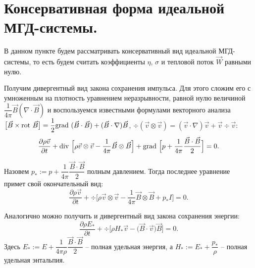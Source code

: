 \documentclass[14pt, a4paper, fleqn]{extreport}
\begin{document}
    \section{Консервативная форма идеальной \\
             МГД-системы.}

    В данном пункте будем рассматривать консервативный вид идеальной
    МГД-системы, то есть будем считать коэффициенты $\eta$, $\sigma$ 
    и тепловой поток $\vec{W}$ равными нулю.
    
    Получим дивергентный вид закона сохранения импульса. 
    Для этого сложим его с умноженным на плотность уравнением неразрывности,
    равной нулю величиной $\dfrac{1}{4\pi}\vec{B}(\nabla\cdot\vec{B})$
    и воспользуемся известными формулами векторного анализа 
    $\big[ \vec{B} \times \text{rot }{\vec{B}} \big] = 
        \dfrac{1}{2}\text{grad }{(\vec{B} \cdot \vec{B})} + (\vec{B} \cdot \nabla)\vec{B}$,
    $\div{(\vec{v}\otimes\vec{v})} = (\vec{v} \cdot \nabla)\vec{v} + \vec{v}\div{\vec{v}}$:
    \begin{equation*}
        \dfrac{\partial\rho\vec{v}}{\partial t}
            + \text{div }{\Big[ \rho\vec{v}\otimes\vec{v} - \dfrac{1}{4\pi}\vec{B}\otimes\vec{B} \Big]}
            + \text{grad }{\Big[ p + \dfrac{1}{4\pi}\dfrac{\vec{B}\cdot\vec{B}}{2} \Big]} = 0.
    \end{equation*}
    
    Назовем $p_* := p + \dfrac{1}{4\pi}\dfrac{\vec{B}\cdot\vec{B}}{2}$ полным давлением.
    Тогда последнее уравнение примет свой окончательный вид:
    \begin{equation*}
        \dfrac{\partial\rho\vec{v}}{\partial t}
            + \div{\Big[ \rho\vec{v}\otimes\vec{v} - \dfrac{1}{4\pi}\vec{B}\otimes\vec{B} 
                + p_*I \Big]} = 0.
    \end{equation*}
    
    Аналогично можно получить и дивергентный вид закона сохранения энергии:
    \begin{equation*}
        \dfrac{\partial\rho E_*}{\partial t}
            + \div{\Big[ \rho H_* \vec{v} 
                - \big( \vec{B} \cdot \vec{v} \big) \vec{B} \Big]} = 0.
    \end{equation*}
    Здесь $E_* := E + \dfrac{1}{4\pi\rho}\dfrac{\vec{B}\cdot\vec{B}}{2}$ -- полная удельная энергия,
    а $H_* := E_* + \dfrac{p_*}{\rho}$ -- полная удельная энтальпия.
\end{document}
